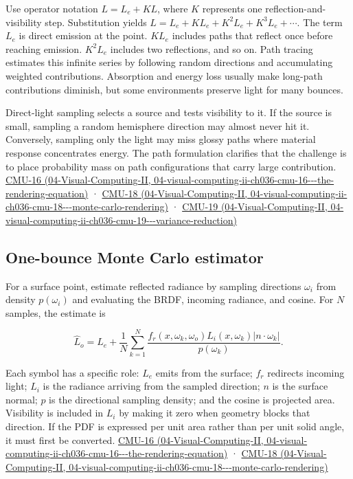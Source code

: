 Use operator notation \(L=L_e+KL\), where \(K\) represents one reflection-and-visibility step. Substitution yields \(L=L_e+KL_e+K^2L_e+K^3L_e+\cdots\). The term \(L_e\) is direct emission at the point. \(KL_e\) includes paths that reflect once before reaching emission. \(K^2L_e\) includes two reflections, and so on. Path tracing estimates this infinite series by following random directions and accumulating weighted contributions. Absorption and energy loss usually make long-path contributions diminish, but some environments preserve light for many bounces.

Direct-light sampling selects a source and tests visibility to it. If the source is small, sampling a random hemisphere direction may almost never hit it. Conversely, sampling only the light may miss glossy paths where material response concentrates energy. The path formulation clarifies that the challenge is to place probability mass on path configurations that carry large contribution. \href{../04-Visual-Computing-II/main.pdf\#nameddest=04-visual-computing-ii-ch036-cmu-16---the-rendering-equation}{CMU-16 (04-Visual-Computing-II, 04-visual-computing-ii-ch036-cmu-16-\/-\/-the-rendering-equation)} · \href{../04-Visual-Computing-II/main.pdf\#nameddest=04-visual-computing-ii-ch036-cmu-18---monte-carlo-rendering}{CMU-18 (04-Visual-Computing-II, 04-visual-computing-ii-ch036-cmu-18-\/-\/-monte-carlo-rendering)} · \href{../04-Visual-Computing-II/main.pdf\#nameddest=04-visual-computing-ii-ch036-cmu-19---variance-reduction}{CMU-19 (04-Visual-Computing-II, 04-visual-computing-ii-ch036-cmu-19-\/-\/-variance-reduction)}

\subsection{One-bounce Monte Carlo estimator}\label{03-visual-computing-i-ch011-one-bounce-monte-carlo-estimator}

For a surface point, estimate reflected radiance by sampling directions \(\omega_i\) from density \(p(\omega_i)\) and evaluating the BRDF, incoming radiance, and cosine. For \(N\) samples, the estimate is

\[
\widehat L_o=L_e+\frac1N\sum_{k=1}^N\frac{f_r(x,\omega_k,\omega_o)L_i(x,\omega_k)|n\cdot\omega_k|}{p(\omega_k)}.
\]

Each symbol has a specific role: \(L_e\) emits from the surface; \(f_r\) redirects incoming light; \(L_i\) is the radiance arriving from the sampled direction; \(n\) is the surface normal; \(p\) is the directional sampling density; and the cosine is projected area. Visibility is included in \(L_i\) by making it zero when geometry blocks that direction. If the PDF is expressed per unit area rather than per unit solid angle, it must first be converted. \href{../04-Visual-Computing-II/main.pdf\#nameddest=04-visual-computing-ii-ch036-cmu-16---the-rendering-equation}{CMU-16 (04-Visual-Computing-II, 04-visual-computing-ii-ch036-cmu-16-\/-\/-the-rendering-equation)} · \href{../04-Visual-Computing-II/main.pdf\#nameddest=04-visual-computing-ii-ch036-cmu-18---monte-carlo-rendering}{CMU-18 (04-Visual-Computing-II, 04-visual-computing-ii-ch036-cmu-18-\/-\/-monte-carlo-rendering)}

